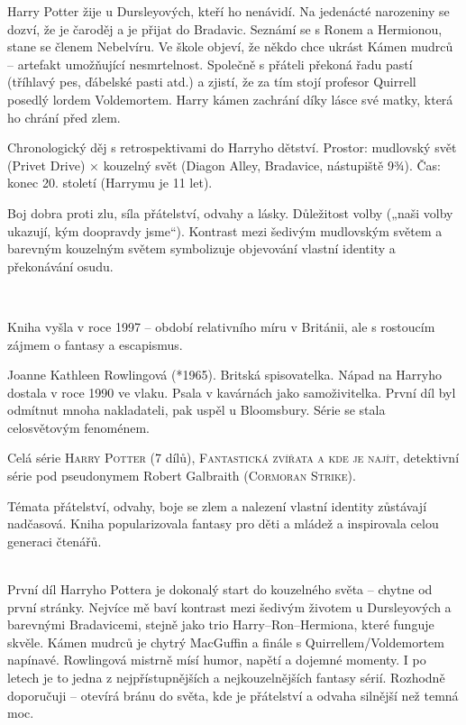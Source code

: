 \documentclass[FGBook.tex]{subfiles}
\begin{document}
\noindent Harry Potter žije u Dursleyových, kteří ho nenávidí. Na jedenácté narozeniny se dozví, že je čaroděj a je přijat do Bradavic. Seznámí se s Ronem a Hermionou, stane se členem Nebelvíru. Ve škole objeví, že někdo chce ukrást Kámen mudrců – artefakt umožňující nesmrtelnost. Společně s přáteli překoná řadu pastí (tříhlavý pes, ďábelské pasti atd.) a zjistí, že za tím stojí profesor Quirrell posedlý lordem Voldemortem. Harry kámen zachrání díky lásce své matky, která ho chrání před zlem.

\noindent Chronologický děj s retrospektivami do Harryho dětství. Prostor: mudlovský svět (Privet Drive) × kouzelný svět (Diagon Alley, Bradavice, nástupiště 9¾). Čas: konec 20. století (Harrymu je 11 let).

\noindent Boj dobra proti zlu, síla přátelství, odvahy a lásky. Důležitost volby („naši volby ukazují, kým doopravdy jsme“). Kontrast mezi šedivým mudlovským světem a barevným kouzelným světem symbolizuje objevování vlastní identity a překonávání osudu.

\vspace*{2em}\\

\noindent Kniha vyšla v roce 1997 – období relativního míru v Británii, ale s rostoucím zájmem o fantasy a escapismus.

\noindent Joanne Kathleen Rowlingová (*1965). Britská spisovatelka. Nápad na Harryho dostala v roce 1990 ve vlaku. Psala v kavárnách jako samoživitelka. První díl byl odmítnut mnoha nakladateli, pak uspěl u Bloomsbury. Série se stala celosvětovým fenoménem.

\noindent Celá série \textsc{Harry Potter} (7 dílů), \textsc{Fantastická zvířata a kde je najít}, detektivní série pod pseudonymem Robert Galbraith (\textsc{Cormoran Strike}).

\noindent Témata přátelství, odvahy, boje se zlem a nalezení vlastní identity zůstávají nadčasová. Kniha popularizovala fantasy pro děti a mládež a inspirovala celou generaci čtenářů.

\vspace*{2em}\\
\noindent První díl Harryho Pottera je dokonalý start do kouzelného světa – chytne od první stránky. Nejvíce mě baví kontrast mezi šedivým životem u Dursleyových a barevnými Bradavicemi, stejně jako trio Harry–Ron–Hermiona, které funguje skvěle. Kámen mudrců je chytrý MacGuffin a finále s Quirrellem/Voldemortem napínavé. Rowlingová mistrně mísí humor, napětí a dojemné momenty. I po letech je to jedna z nejpřístupnějších a nejkouzelnějších fantasy sérií. Rozhodně doporučuji – otevírá bránu do světa, kde je přátelství a odvaha silnější než temná moc.
\end{document}

